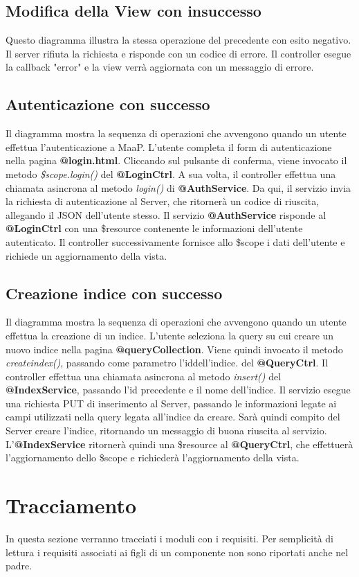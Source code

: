 \subsection{Modifica della View con insuccesso}
Questo diagramma illustra la stessa operazione del precedente con esito negativo. Il server rifiuta la richiesta e risponde con un codice di errore.
Il controller esegue la callback "error" e la view verrà aggiornata con un messaggio di errore.

\subsection{Autenticazione con successo}
Il diagramma mostra la sequenza di operazioni che avvengono quando un utente effettua l'autenticazione a MaaP. L'utente completa il form di autenticazione nella pagina \textbf{@login.html}. Cliccando sul pulsante di conferma, viene invocato il metodo \textit{\$scope.login()} del \textbf{@LoginCtrl}. A sua volta, il controller effettua una chiamata asincrona al metodo \textit{login()} di \textbf{@AuthService}. Da qui, il servizio invia la richiesta di autenticazione al Server, che ritornerà un codice di riuscita, allegando il JSON dell'utente stesso. Il servizio \textbf{@AuthService} risponde al \textbf{@LoginCtrl} con una \$resource contenente le informazioni dell'utente autenticato. Il controller successivamente fornisce allo \$scope i dati dell'utente e richiede un aggiornamento della vista.

\subsection{Creazione indice con successo}
Il diagramma mostra la sequenza di operazioni che avvengono quando un utente effettua la creazione di un indice. L'utente seleziona la query su cui creare un nuovo indice nella pagina \textbf{@queryCollection}. Viene quindi invocato il metodo \textit{createindex()}, passando come parametro l'iddell'indice. del \textbf{@QueryCtrl}. Il controller effettua una chiamata asincrona al metodo \textit{insert()} del \textbf{@IndexService}, passando l'id precedente e il nome dell'indice. Il servizio esegue una richiesta PUT di inserimento al Server, passando le informazioni legate ai campi utilizzati nella query legata all'indice da creare. Sarà quindi compito del Server creare l'indice, ritornando un messaggio di buona riuscita al servizio. L'\textbf{@IndexService} ritornerà quindi una \$resource al \textbf{@QueryCtrl}, che effettuerà l'aggiornamento dello \$scope e richiederà l'aggiornamento della vista.

\section{Tracciamento}
In questa sezione verranno tracciati i moduli con i requisiti. Per semplicità di lettura i requisiti associati ai figli di un componente non sono riportati anche nel padre.


